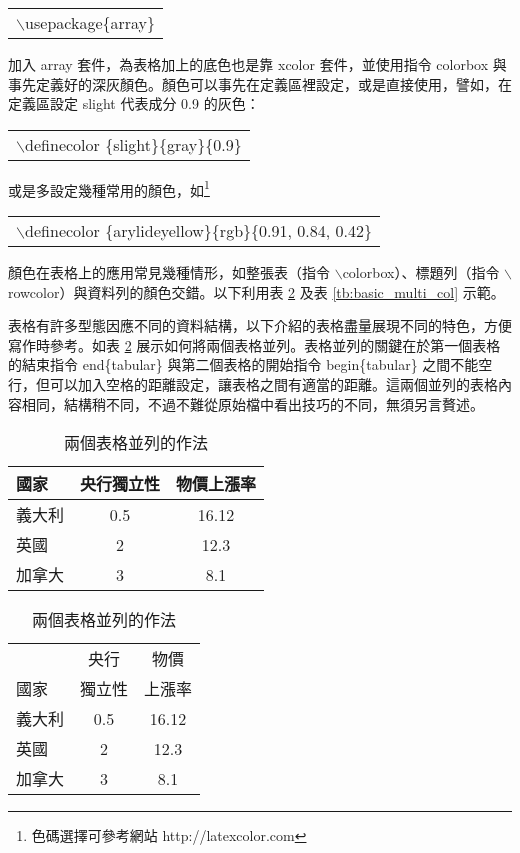 \begin{center}\colorbox{slight}{\begin{tabular}{p{}}
	{\A $\backslash$usepackage\{array\}}
\end{tabular}}\end{center}
\bigskip
加入 {\A array} 套件，為表格加上的底色也是靠 {\A xcolor} 套件，並使用指令 {\A colorbox} 與事先定義好的深灰顏色。顏色可以事先在定義區裡設定，或是直接使用，譬如，在定義區設定 slight 代表成分 0.9 的灰色：

\begin{center}\colorbox{slight}{\begin{tabular}{p{}}
	 {\A $\backslash$definecolor \{slight\}\{gray\}\{0.9\}	}
\end{tabular}}\end{center}
\bigskip
或是多設定幾種常用的顏色，如\footnote{色碼選擇可參考網站 http://latexcolor.com}

\begin{center}\colorbox{arylideyellow}{\begin{tabular}{p{}}
	 {\A $\backslash$definecolor \{arylideyellow\}\{rgb\}\{0.91, 0.84, 0.42\}	}
\end{tabular}}\end{center}
\bigskip

顏色在表格上的應用常見幾種情形，如整張表（指令 $\backslash$colorbox）、標題列（指令 $\backslash$rowcolor）與資料列的顏色交錯。以下利用表 \ref{tb:basic_two_table} 及表 \ref{tb:basic_multi_col} 示範。

表格有許多型態因應不同的資料結構，以下介紹的表格盡量展現不同的特色，方便寫作時參考。如表 \ref{tb:basic_two_table} 展示如何將兩個表格並列。表格並列的關鍵在於第一個表格的結束指令 {\A end\{tabular\}} 與第二個表格的開始指令 {\A begin\{tabular\}} 之間不能空行，但可以加入空格的距離設定，讓表格之間有適當的距離。這兩個並列的表格內容相同，結構稍不同，不過不難從原始檔中看出技巧的不同，無須另言贅述。

\begin{table}[h]
    \centering
    \caption{兩個表格並列的作法}\label{tb:basic_two_table}
    \extrarowheight=4pt
    \colorbox{beaublue}{\begin{tabular}{lcc}
    \hline
    國家		& 央行獨立性	& 物價上漲率 \\\hline
    義大利   	& 0.5       	& 16.12 \\
    英國    	& 2         	& 12.3 \\
    加拿大   	& 3         	& 8.1 \\\hline
    \end{tabular}}\hspace{10pt}
    \begin{tabular}{lcc}
    \hline \rowcolor{beige}
           	& 央行	& 物價 \\[-2pt]\rowcolor{beige}
    國家    	& 獨立性 	& 上漲率 \\\hline
    義大利  	& 0.5   	& 16.12 \\
    英國    	& 2     	& 12.3 \\
    加拿大   	& 3     	& 8.1 \\\hline
    \end{tabular}
\end{table}

